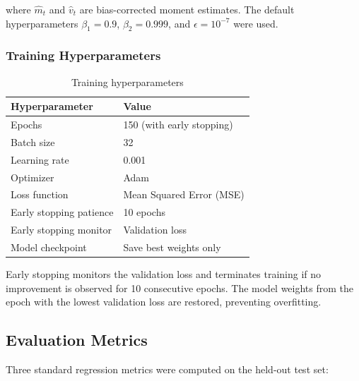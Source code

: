 \documentclass[11pt, a4paper]{article}
\begin{document}
where $\hat{m}_t$ and $\hat{v}_t$ are bias-corrected moment estimates. The
default hyperparameters $\beta_1 = 0.9$, $\beta_2 = 0.999$, and
$\epsilon = 10^{-7}$ were used.

\subsubsection{Training Hyperparameters}

\begin{table}[H]
    \centering
    \caption{Training hyperparameters}\label{tab:hyperparams}
    \begin{tcolorbox}[colback=lightgray, colframe=rulecolor, boxrule=0.5pt, arc=4mm, auto outer arc, width=0.98\textwidth, halign=center]
        \renewcommand{\arraystretch}{1.5}
        \begin{tabular}{@{}ll@{}}
        \toprule
        \textbf{Hyperparameter} & \textbf{Value} \\
        \midrule
        Epochs & 150 (with early stopping) \\
        Batch size & 32 \\
        Learning rate & 0.001 \\
        Optimizer & Adam \\
        Loss function & Mean Squared Error (MSE) \\
        Early stopping patience & 10 epochs \\
        Early stopping monitor & Validation loss \\
        Model checkpoint & Save best weights only \\
        \bottomrule
        \end{tabular}
    \end{tcolorbox}
\end{table}

Early stopping monitors the validation loss and terminates training if no
improvement is observed for 10 consecutive epochs. The model weights from the
epoch with the lowest validation loss are restored, preventing overfitting.

\subsection{Evaluation Metrics}

Three standard regression metrics were computed on the held-out test set:
\end{document}
